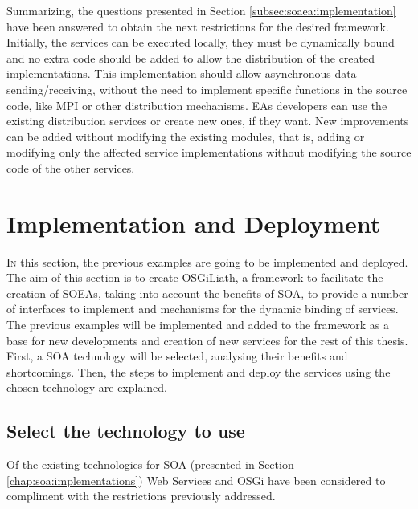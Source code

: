 Summarizing, the questions presented in Section \ref{subsec:soaea:implementation} have been answered to obtain the next restrictions for the desired framework. Initially, the services can be executed locally, they must be dynamically bound and no extra code should be added to allow the distribution of the created implementations. This implementation should allow asynchronous data sending/receiving, without the need to implement
  specific functions in the source code, like MPI or other
  distribution mechanisms. EAs developers can use the existing
  distribution services or create new ones, if they want. New improvements can be added
  without modifying the existing modules, that is, adding or modifying
  only the affected service implementations without modifying the
  source code of the other services.

\section{Implementation and Deployment}

\lettrine{I}{n} this section, the previous examples are going to be implemented and deployed. The aim of this section is to create OSGiLiath, a framework to facilitate the creation of SOEAs, taking into account the benefits  of SOA, to provide a number of interfaces to implement and mechanisms for the dynamic binding of services. The previous examples will be implemented and added to the framework as a base for new developments and creation of new services for the rest of this thesis. First, a SOA technology will be selected, analysing their benefits and shortcomings. Then, the steps to implement and deploy the services using the chosen technology are explained.

\subsection{Select the technology to use}
\label{sec:osgiliath:technology}

Of the existing technologies for SOA (presented in Section \ref{chap:soa:implementations}) Web Services and OSGi have been considered to compliment with the restrictions previously addressed.


